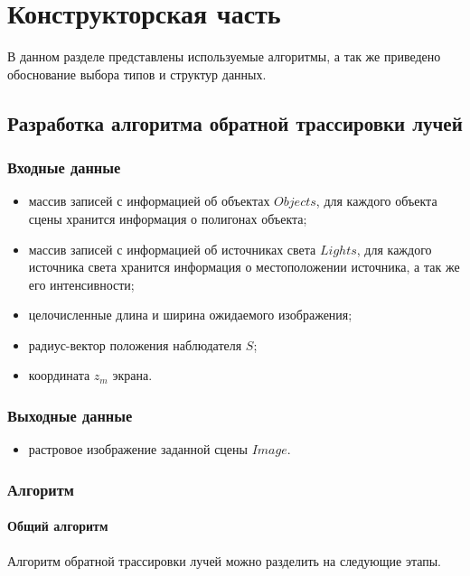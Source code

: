 \chapter{Конструкторская часть}
В данном разделе представлены используемые алгоритмы, а так же приведено обоснование выбора типов и структур данных.

\section{Разработка алгоритма обратной трассировки лучей}

\subsection{Входные данные}

\begin{itemize}
	\item массив записей с информацией об объектах $Objects$, для каждого объекта сцены хранится информация о полигонах объекта;
	\item массив записей с информацией об источниках света $Lights$, для каждого источника света хранится информация о местоположении источника, а так же его интенсивности;
	\item целочисленные длина и ширина ожидаемого изображения;
	\item радиус-вектор положения наблюдателя $S$;
	\item координата $z_m$ экрана.
\end{itemize}

\subsection{Выходные данные}

\begin{itemize}
	\item растровое изображение заданной сцены $Image$.
\end{itemize}

\subsection{Алгоритм}

\subsubsection{Общий алгоритм}

Алгоритм обратной трассировки лучей можно разделить на следующие этапы.

